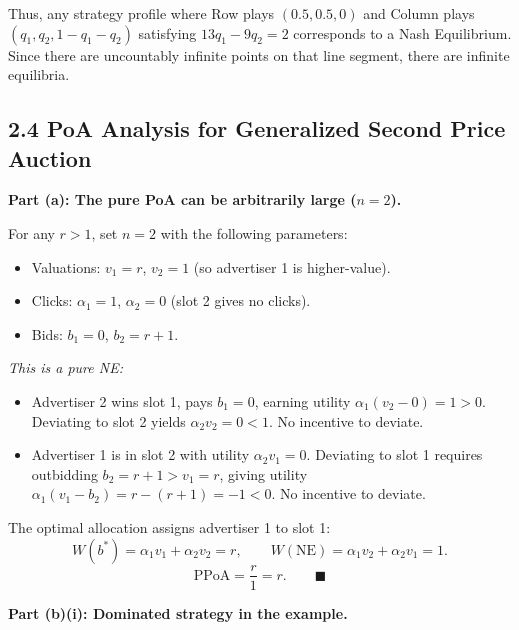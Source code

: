 \documentclass{article}
\begin{document}
Thus, any strategy profile where Row plays $(0.5, 0.5, 0)$ and Column plays $(q_1, q_2, 1 - q_1 - q_2)$ satisfying $13q_1 - 9q_2 = 2$ corresponds to a Nash Equilibrium. Since there are uncountably infinite points on that line segment, there are infinite equilibria. 


\newpage
\subsection*{2.4 PoA Analysis for Generalized Second Price Auction}

\noindent\textbf{Part (a): The pure PoA can be arbitrarily large ($n=2$).}

\medskip
For any $r > 1$, set $n=2$ with the following parameters:
\begin{itemize}
    \item Valuations: $v_1 = r$, $v_2 = 1$ (so advertiser 1 is higher-value).
    \item Clicks: $\alpha_1 = 1$, $\alpha_2 = 0$ (slot 2 gives no clicks).
    \item Bids: $b_1 = 0$, $b_2 = r + 1$.
\end{itemize}

\noindent\textit{This is a pure NE:}
\begin{itemize}
    \item Advertiser 2 wins slot 1, pays $b_1 = 0$, earning utility $\alpha_1(v_2 - 0) = 1 > 0$. Deviating to slot 2 yields $\alpha_2 v_2 = 0 < 1$. No incentive to deviate.
    \item Advertiser 1 is in slot 2 with utility $\alpha_2 v_1 = 0$. Deviating to slot 1 requires outbidding $b_2 = r+1 > v_1 = r$, giving utility $\alpha_1(v_1 - b_2) = r - (r+1) = -1 < 0$. No incentive to deviate.
\end{itemize}

The optimal allocation assigns advertiser 1 to slot 1:
$$ W(b^*) = \alpha_1 v_1 + \alpha_2 v_2 = r, \qquad W(\text{NE}) = \alpha_1 v_2 + \alpha_2 v_1 = 1. $$
$$\text{PPoA} = \frac{r}{1} = r. \qquad \blacksquare$$

\medskip
\noindent\textbf{Part (b)(i): Dominated strategy in the example.}
\end{document}
